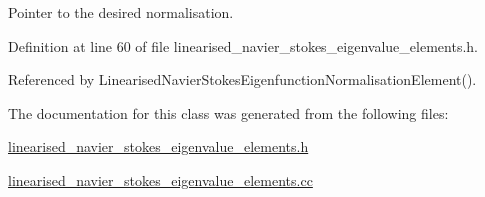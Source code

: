 Pointer to the desired normalisation. 



Definition at line 60 of file linearised\+\_\+navier\+\_\+stokes\+\_\+eigenvalue\+\_\+elements.\+h.



Referenced by Linearised\+Navier\+Stokes\+Eigenfunction\+Normalisation\+Element().



The documentation for this class was generated from the following files\+:\begin{DoxyCompactItemize}
\item 
\hyperlink{linearised__navier__stokes__eigenvalue__elements_8h}{linearised\+\_\+navier\+\_\+stokes\+\_\+eigenvalue\+\_\+elements.\+h}\item 
\hyperlink{linearised__navier__stokes__eigenvalue__elements_8cc}{linearised\+\_\+navier\+\_\+stokes\+\_\+eigenvalue\+\_\+elements.\+cc}\end{DoxyCompactItemize}
